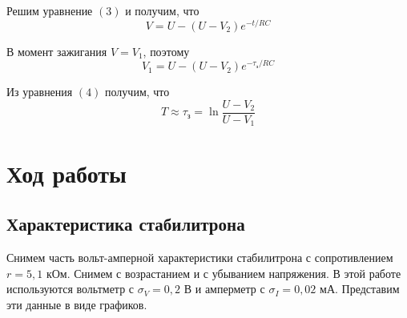 \documentclass[a4paper, 12pt]{article}%
\begin{document}
Решим уравнение $(3)$ и получим, что 
\begin{equation}
V = U - (U - V_2) e^{-t/RC}
\end{equation}

В момент зажигания $V = V_1$, поэтому 
\begin{equation}
V_1 = U - (U - V_2) e^{-\tau_{\text{з}}/RC}
\end{equation}

Из уравнения $(4)$ получим, что 
\begin{equation}
T \approx \tau_{\text{з}} = \ln \dfrac{U - V_2}{U - V_1}
\end{equation}
\section*{Ход работы}
\subsection*{Характеристика стабилитрона}
Снимем часть вольт-амперной характеристики стабилитрона с сопротивлением $r = 5,1$ кОм. Снимем с возрастанием и с убыванием напряжения. В этой работе используются вольтметр с $\sigma_V = 0,2$ В и амперметр с $\sigma_I = 0,02$ мА. Представим эти данные в виде графиков.
\end{document}
